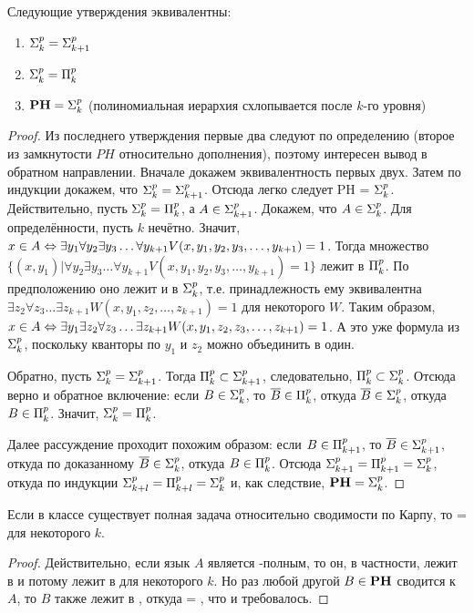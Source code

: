 \begin{theorem}
Следующие утверждения эквивалентны:

\begin{enumerate}
    \item $\textbf{$\Sigma_{k}^p$} = \textbf{$\Sigma_{k + 1}^p$}$
    \item $\textbf{$\Sigma_{k}^p$} = \textbf{$\Pi_{k}^p$}$
    \item $\textbf{PH} = \textbf{$\Sigma_{k}^p$}$ (полиномиальная иерархия схлопывается после $k$-го уровня)
\end{enumerate}
\end{theorem}

\begin{proof}
Из последнего утверждения первые два следуют по определению (второе из замкнутости $PH$ относительно дополнения), поэтому интересен вывод в обратном направлении. Вначале докажем эквивалентность первых двух. Затем по индукции докажем, что $\textbf{$\Sigma_{k}^p$} = \textbf{$\Sigma_{k+1}^p$}$. Отсюда легко следует PH = $\textbf{$\Sigma_{k}^p$}$.
Действительно, пусть $\textbf{$\Sigma_{k}^p$} = \textbf{$\Pi_{k}^p$}$, а $A \in \textbf{$\Sigma_{k + 1}^p$}$. Докажем, что $A \in \textbf{$\Sigma_{k}^p$}$. Для определённости, пусть $k$ нечётно. Значит, 
$x \in A \Leftrightarrow \exists y_1 \forall y_2 \exists y_3 \ldots \forall y_{k + 1} V(x, y_1, y_2, y_3, \ldots, y_{k + 1}) = 1$. Тогда множество $\{ (x, y_1) | \forall y_2 \exists y_3 \ldots \forall y_{k + 1} V(x, y_1, y_2, y_3, \ldots, y_{k + 1}) = 1\}$ лежит в $\textbf{$\Pi_{k}^p$}$. По предположению оно лежит и в $\textbf{$\Sigma_{k}^p$}$,
т.е. принадлежность ему эквивалентна $\exists z_2 \forall z_3 \ldots \exists z_{k+1} W(x, y_1, z_2, \ldots, z_{k+1})=1$ для некоторого $W$. Таким образом, $x \in A \Leftrightarrow \exists y_1 \exists z_2 \forall z_3 \ldots \exists z_{k + 1} W(x, y_1, z_2, z_3, \ldots, z_{k + 1}) = 1$. А это уже формула из $\textbf{$\Sigma_{k}^p$}$, поскольку кванторы по $y_1$ и $z_2$ можно объединить
в один.

Обратно, пусть $\textbf{$\Sigma_{k}^p$} = \textbf{$\Sigma_{k + 1}^p$}$. Тогда $\textbf{$\Pi_{k}^p$} \subset \textbf{$\Sigma_{k + 1}^p$}$, следовательно, $\textbf{$\Pi_{k}^p$} \subset \textbf{$\Sigma_{k}^p$}$. Отсюда верно и обратное включение: если $B \in \textbf{$\Sigma_{k}^p$}$, то $\overline{B} \in \textbf{$\Pi_{k}^p$}$, откуда $\overline{B} \in \textbf{$\Sigma_{k}^p$}$, откуда $B \in \textbf{$\Pi_{k}^p$}$. Значит, $\textbf{$\Sigma_{k}^p$} = \textbf{$\Pi_{k}^p$}$.

Далее рассуждение проходит похожим образом: если $B \in \textbf{$\Pi_{k + 1}^p$}$, то $\overline{B} \in \textbf{$\Sigma_{k + 1}^p$}$, откуда по доказанному $\overline{B} \in \textbf{$\Sigma_{k}^p$}$, откуда $B \in \textbf{$\Pi_{k}^p$}$. Отсюда $\textbf{$\Sigma_{k + 1}^p$} = \textbf{$\Pi_{k + 1}^p$} = \textbf{$\Sigma_{k}^p$}$, откуда по индукции $\textbf{$\Sigma_{k + l}^p$} = \textbf{$\Pi_{k + l}^p$} = \textbf{$\Sigma_{k}^p$}$ и, как следствие, $\textbf{PH} = \textbf{$\Sigma_{k}^p$}$.
\end{proof}

\begin{statement}
Если в классе \ph существует полная задача относительно сводимости по Карпу, то \ph =  для некоторого $k$.
\end{statement}

\begin{proof}
Действительно, если язык $A$ является \ph-полным, то он, в частности, лежит в \ph и потому лежит в  для некоторого $k$. Но раз любой другой $B \in \textbf{PH}$ сводится к $A$, то $B$ также лежит в , откуда \ph = , что и требовалось.
\end{proof}
